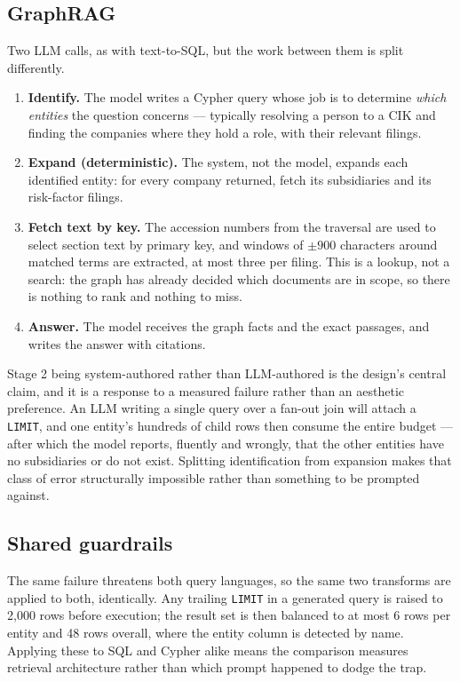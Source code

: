 \subsection{GraphRAG}

Two LLM calls, as with text-to-SQL, but the work between them is split
differently.

\begin{enumerate}
  \item \textbf{Identify.} The model writes a Cypher query whose job is to
        determine \emph{which entities} the question concerns --- typically
        resolving a person to a CIK and finding the companies where they hold a
        role, with their relevant filings.
  \item \textbf{Expand (deterministic).} The system, not the model, expands each
        identified entity: for every company returned, fetch its subsidiaries and
        its risk-factor filings.
  \item \textbf{Fetch text by key.} The accession numbers from the traversal are
        used to select section text by primary key, and windows of $\pm 900$
        characters around matched terms are extracted, at most three per filing.
        This is a lookup, not a search: the graph has already decided which
        documents are in scope, so there is nothing to rank and nothing to miss.
  \item \textbf{Answer.} The model receives the graph facts and the exact
        passages, and writes the answer with citations.
\end{enumerate}

Stage 2 being system-authored rather than LLM-authored is the design's central
claim, and it is a response to a measured failure rather than an aesthetic
preference. An LLM writing a single query over a fan-out join will attach a
\texttt{LIMIT}, and one entity's hundreds of child rows then consume the entire
budget --- after which the model reports, fluently and wrongly, that the other
entities have no subsidiaries or do not exist. Splitting identification from
expansion makes that class of error structurally impossible rather than something
to be prompted against.

\subsection{Shared guardrails}

The same failure threatens both query languages, so the same two transforms are
applied to both, identically. Any trailing \texttt{LIMIT} in a generated query is
raised to 2{,}000 rows before execution; the result set is then balanced to at
most 6 rows per entity and 48 rows overall, where the entity column is detected by
name. Applying these to SQL and Cypher alike means the comparison measures
retrieval architecture rather than which prompt happened to dodge the trap.

